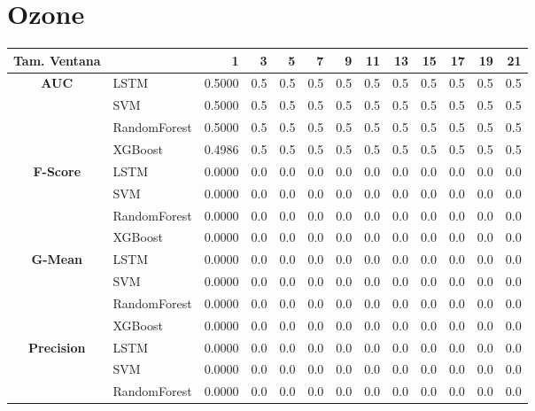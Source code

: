 \section{Ozone}
\begin{table}[h]
	\centering
	\begin{adjustbox}{max width=11cm}
		\begin{tabular}{|c|l|r|r|r|r|r|r|r|r|r|r|r|}
			\hline
			\textbf{Tam. Ventana} &         &      1  &   3  &   5  &   7  &   9  &   11 &   13 &   15 &   17 &   19 &   21 \\
			\hline
			\textbf{AUC} & LSTM &  0.5000 &  0.5 &  0.5 &  0.5 &  0.5 &  0.5 &  0.5 &  0.5 &  0.5 &  0.5 &  0.5 \\
			& SVM &  0.5000 &  0.5 &  0.5 &  0.5 &  0.5 &  0.5 &  0.5 &  0.5 &  0.5 &  0.5 &  0.5 \\
			& RandomForest &  0.5000 &  0.5 &  0.5 &  0.5 &  0.5 &  0.5 &  0.5 &  0.5 &  0.5 &  0.5 &  0.5 \\
			& XGBoost &  0.4986 &  0.5 &  0.5 &  0.5 &  0.5 &  0.5 &  0.5 &  0.5 &  0.5 &  0.5 &  0.5 \\
			\hline
			\textbf{F-Score} & LSTM &  0.0000 &  0.0 &  0.0 &  0.0 &  0.0 &  0.0 &  0.0 &  0.0 &  0.0 &  0.0 &  0.0 \\
			& SVM &  0.0000 &  0.0 &  0.0 &  0.0 &  0.0 &  0.0 &  0.0 &  0.0 &  0.0 &  0.0 &  0.0 \\
			& RandomForest &  0.0000 &  0.0 &  0.0 &  0.0 &  0.0 &  0.0 &  0.0 &  0.0 &  0.0 &  0.0 &  0.0 \\
			& XGBoost &  0.0000 &  0.0 &  0.0 &  0.0 &  0.0 &  0.0 &  0.0 &  0.0 &  0.0 &  0.0 &  0.0 \\
			\hline
			\textbf{G-Mean} & LSTM &  0.0000 &  0.0 &  0.0 &  0.0 &  0.0 &  0.0 &  0.0 &  0.0 &  0.0 &  0.0 &  0.0 \\
			& SVM &  0.0000 &  0.0 &  0.0 &  0.0 &  0.0 &  0.0 &  0.0 &  0.0 &  0.0 &  0.0 &  0.0 \\
			& RandomForest &  0.0000 &  0.0 &  0.0 &  0.0 &  0.0 &  0.0 &  0.0 &  0.0 &  0.0 &  0.0 &  0.0 \\
			& XGBoost &  0.0000 &  0.0 &  0.0 &  0.0 &  0.0 &  0.0 &  0.0 &  0.0 &  0.0 &  0.0 &  0.0 \\
			\hline
			\textbf{Precision} & LSTM &  0.0000 &  0.0 &  0.0 &  0.0 &  0.0 &  0.0 &  0.0 &  0.0 &  0.0 &  0.0 &  0.0 \\
			& SVM &  0.0000 &  0.0 &  0.0 &  0.0 &  0.0 &  0.0 &  0.0 &  0.0 &  0.0 &  0.0 &  0.0 \\
			& RandomForest &  0.0000 &  0.0 &  0.0 &  0.0 &  0.0 &  0.0 &  0.0 &  0.0 &  0.0 &  0.0 &  0.0 \\

\end{tabular}
\end{adjustbox}
\end{table}
